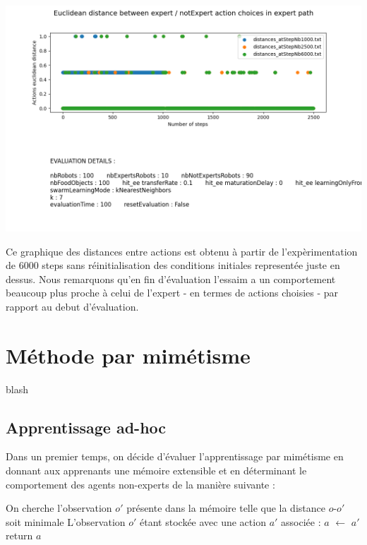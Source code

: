 \documentclass[a4paper, 12pt]{report}
\begin{document}
    \includegraphics[scale=0.5]{Compte_Rendu/images/distances_knn.png}
    
    Ce graphique des distances entre actions est obtenu à partir de l'expèrimentation de 6000 steps sans réinitialisation des conditions initiales representée juste en dessus. Nous remarquons qu'en fin d'évaluation l'essaim a un comportement beaucoup plus proche à celui de l'expert - en termes de actions choisies - par rapport au debut d'évaluation.
    
    
    
    
    
	\section{Méthode par mimétisme}
	blash
	\subsection{Apprentissage ad-hoc}
	Dans un premier temps, on décide d'évaluer l'apprentissage par mimétisme en donnant aux apprenants une mémoire extensible et en déterminant le comportement des agents non-experts de la manière suivante :
	

	\begin{algorithm}[H]
		\;
  		On cherche l'observation $o'$ présente dans la mémoire telle que la distance $o$-$o'$ soit minimale\;
		L'observation $o'$ étant stockée avec une action $a'$ associée : $a$ $\leftarrow$ $a'$ \;
  		return $a$\;
	\end{algorithm}
	
\end{document}
